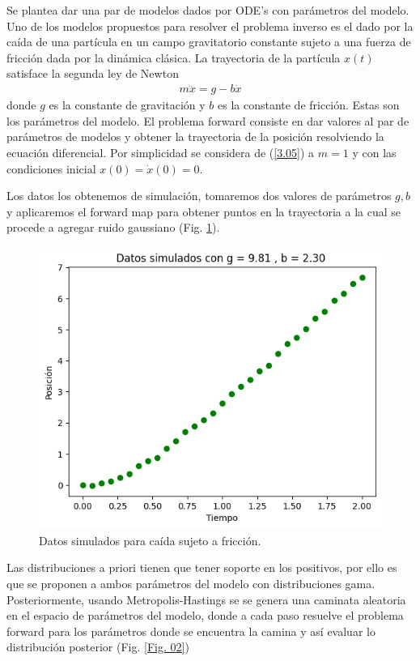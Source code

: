 \documentclass{article}
\begin{document}
Se plantea dar una par de modelos dados por ODE's con parámetros del modelo. Uno de los modelos propuestos para resolver el problema inverso es el dado por la caída de una partícula en un campo gravitatorio constante sujeto a una fuerza de fricción dada por la dinámica clásica. La trayectoria de la partícula $x(t)$ satisface la segunda ley de Newton
\begin{align}
    m\ddot{x} = g - b \dot{x}
    \label{3.05}
\end{align}
donde $g$ es la constante de gravitación y $b$ es la constante de fricción. Estas son los parámetros del modelo. El problema forward consiste en dar valores al par de parámetros de modelos y obtener la trayectoria de la posición resolviendo la ecuación diferencial. Por simplicidad se considera de (\ref{3.05}) a $m =1$ y con las condiciones inicial $x(0)  = \dot{x}(0) = 0$.

Los datos los obtenemos de simulación, tomaremos dos valores de parámetros $g,b$ y aplicaremos el forward map para obtener puntos en la trayectoria a la cual se procede a agregar ruido gaussiano (Fig. \ref{Fig. 01}).

\begin{figure}
    \centering 
    \includegraphics[width = 8 cm]{Figures/datos.png} 
    \caption{Datos simulados para caída sujeto a fricción.}
    \label{Fig. 01}
\end{figure} 

Las distribuciones a priori tienen que tener soporte en los positivos, por ello es que se proponen a ambos parámetros del modelo con distribuciones gama. Posteriormente, usando Metropolis-Hastings se se genera una caminata aleatoria en el espacio de parámetros del modelo, donde a cada paso resuelve el problema forward para los parámetros donde se encuentra la camina y así evaluar lo distribución posterior (Fig. \ref{Fig. 02})
\end{document}
